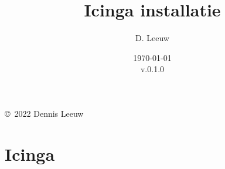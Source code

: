 \documentclass[a4paper,12pt,twoside,openright,titlepage]{book}
\author{D. Leeuw}
\title{Icinga installatie}
\date{\today\\v.0.1.0}
\begin{document}

\maketitle

\copyright\ 2022 Dennis Leeuw\\




\frontmatter

\tableofcontents

\mainmatter
\chapter{Icinga}


\printindex
\end{document}
